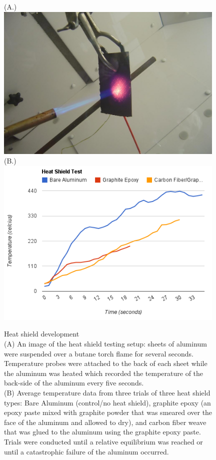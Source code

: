 \documentclass{article}
\begin{document}
\newpage
	\begin{figure}[H]
	\begin{center}
		(A.)
		\includegraphics[width=11cm]{HeatShieldTest}\\
		\vspace{1cm}
		(B.)
		\includegraphics[width=11cm]{HeatShieldTemperatures}\\
	\end{center}
		\caption{}
		\label{shield}
Heat shield development\\(A) An image of the heat shield testing setup: sheets of aluminum were suspended over a butane torch flame for several seconds. Temperature probes were attached to the back of each sheet while the aluminum was heated which recorded the temperature of the back-side of the aluminum every five seconds. \\(B) Average temperature data from three trials of three heat shield types: Bare Aluminum (control/no heat shield), graphite epoxy (an epoxy paste mixed with graphite powder that was smeared over the face of the aluminum and allowed to dry), and carbon fiber weave that was glued to the aluminum using the graphite epoxy paste. Trials were conducted until a relative equilibrium was reached or until a catastrophic failure of the aluminum occurred. 
	\end{figure}
\end{document}
